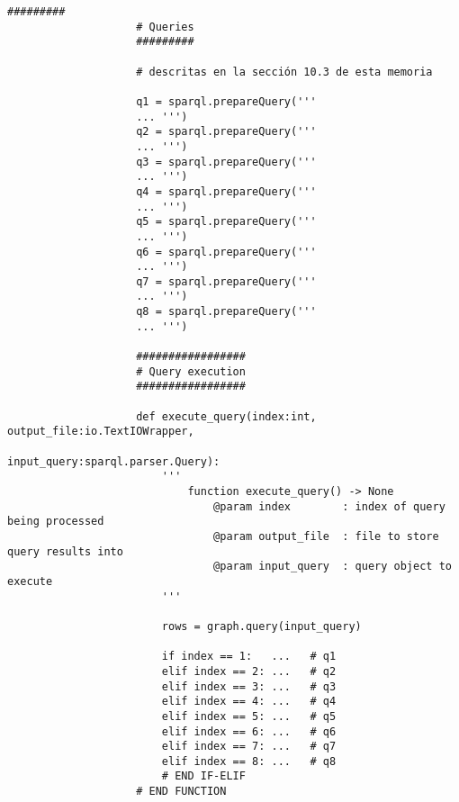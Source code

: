             \begin{minipage}{\linewidth}
                \begin{lstlisting}[language=lPython]
                    #########
                    # Queries
                    #########
                    
                    # descritas en la sección 10.3 de esta memoria
                    
                    q1 = sparql.prepareQuery('''  
                    ... ''')
                    q2 = sparql.prepareQuery('''
                    ... ''')
                    q3 = sparql.prepareQuery('''
                    ... ''')
                    q4 = sparql.prepareQuery('''
                    ... ''')
                    q5 = sparql.prepareQuery('''
                    ... ''')
                    q6 = sparql.prepareQuery('''
                    ... ''')
                    q7 = sparql.prepareQuery('''
                    ... ''')
                    q8 = sparql.prepareQuery('''
                    ... ''')
                    
                    #################
                    # Query execution
                    #################
                    
                    def execute_query(index:int, output_file:io.TextIOWrapper,
                                      input_query:sparql.parser.Query):
                        '''
                            function execute_query() -> None
                                @param index        : index of query being processed
                                @param output_file  : file to store query results into
                                @param input_query  : query object to execute
                        '''
                    
                        rows = graph.query(input_query)
                    
                        if index == 1:   ...   # q1
                        elif index == 2: ...   # q2
                        elif index == 3: ...   # q3
                        elif index == 4: ...   # q4
                        elif index == 5: ...   # q5
                        elif index == 6: ...   # q6
                        elif index == 7: ...   # q7
                        elif index == 8: ...   # q8
                        # END IF-ELIF
                    # END FUNCTION
                \end{lstlisting}
            \end{minipage}
